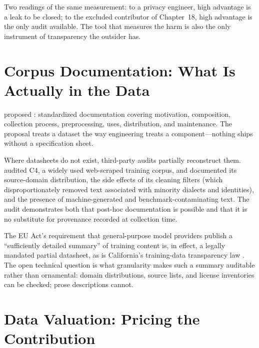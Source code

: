 Two readings of the same measurement: to a privacy engineer, high advantage is a leak to be closed; to the excluded contributor of Chapter~18, high advantage is the only audit available. The tool that measures the harm is also the only instrument of transparency the outsider has.

\section{Corpus Documentation: What Is Actually in the Data}
\label{sec:a18-documentation}

\textcite{gebru2021datasheets} proposed : standardized documentation covering motivation, composition, collection process, preprocessing, uses, distribution, and maintenance. The proposal treats a dataset the way engineering treats a component---nothing ships without a specification sheet.

Where datasheets do not exist, third-party audits partially reconstruct them. \textcite{dodge2021documenting} audited C4, a widely used web-scraped training corpus, and documented its source-domain distribution, the side effects of its cleaning filters (which disproportionately removed text associated with minority dialects and identities), and the presence of machine-generated and benchmark-contaminating text. The audit demonstrates both that post-hoc documentation is possible and that it is no substitute for provenance recorded at collection time.

The EU \ai Act's requirement that general-purpose model providers publish a ``sufficiently detailed summary'' of training content \autocite{euaiact2024} is, in effect, a legally mandated partial datasheet, as is California's training-data transparency law \autocite{ab2013california}. The open technical question is what granularity makes such a summary auditable rather than ornamental: domain distributions, source lists, and license inventories can be checked; prose descriptions cannot.

\section{Data Valuation: Pricing the Contribution}
\label{sec:a18-valuation}

